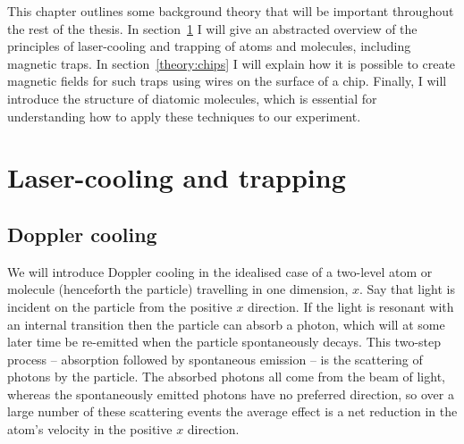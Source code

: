 This chapter outlines some background theory that will be important throughout
the rest of the thesis. In section~\ref{theory:cooltrap} I will give an
abstracted overview of the principles of laser-cooling and trapping of atoms
and molecules, including magnetic traps. In section~\ref{theory:chips} I will
explain how it is possible to create magnetic fields for such traps using wires
on the surface of a chip. Finally, I will introduce the structure of diatomic
molecules, which is essential for understanding how to apply these techniques
to our experiment.

\section{Laser-cooling and trapping}
\label{theory:cooltrap}

\subsection{Doppler cooling}

We will introduce Doppler cooling in the idealised case of a two-level atom or
molecule (henceforth the particle) travelling in one dimension, $x$.  Say that
light is incident on the particle from the positive $x$ direction. If the light
is resonant with an internal transition then the particle can absorb a photon,
which will at some later time be re-emitted when the particle spontaneously
decays.
%
This two-step process -- absorption followed by spontaneous emission -- is the
scattering of photons by the particle. The absorbed photons all come from the
beam of light, whereas the spontaneously emitted photons have no preferred
direction, so over a large number of these scattering events the average effect
is a net reduction in the atom's velocity in the positive $x$ direction.


